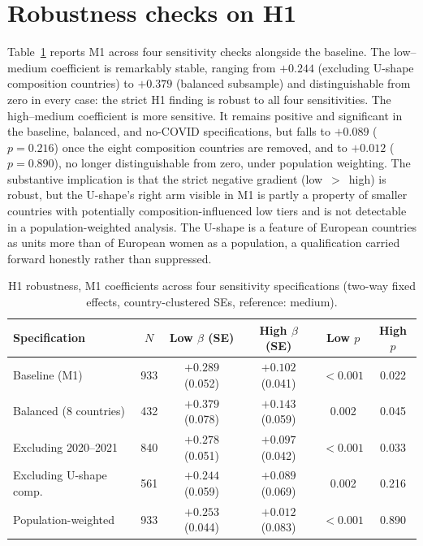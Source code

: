 \documentclass[12pt,a4paper]{report}
\begin{document}
\section{Robustness checks on H1}
Table~\ref{tab:robust} reports M1 across four sensitivity checks alongside the baseline. The low--medium
coefficient is remarkably stable, ranging from $+0.244$ (excluding U-shape composition countries) to
$+0.379$ (balanced subsample) and distinguishable from zero in every case: the strict H1 finding is
robust to all four sensitivities. The high--medium coefficient is more sensitive. It remains positive
and significant in the baseline, balanced, and no-COVID specifications, but falls to $+0.089$
($p=0.216$) once the eight composition countries are removed, and to $+0.012$ ($p=0.890$), no longer
distinguishable from zero, under population weighting. The substantive implication is that the strict
negative gradient (low~$>$~high) is robust, but the U-shape's right arm visible in M1 is partly a
property of smaller countries with potentially composition-influenced low tiers and is not detectable
in a population-weighted analysis.
The U-shape is a feature of European countries as units more than of European women as a population, a
qualification carried forward honestly rather than suppressed.

\begin{table}[ht]
\centering
\caption{H1 robustness, M1 coefficients across four sensitivity specifications (two-way fixed effects, country-clustered SEs, reference: medium).}
\label{tab:robust}
\small
\begin{tabular}{@{}lccccc@{}}
\toprule
Specification & $N$ & Low $\beta$ (SE) & High $\beta$ (SE) & Low $p$ & High $p$ \\
\midrule
Baseline (M1)            & 933 & $+0.289$ (0.052) & $+0.102$ (0.041) & $<0.001$ & 0.022 \\
Balanced (8 countries)   & 432 & $+0.379$ (0.078) & $+0.143$ (0.059) & 0.002 & 0.045 \\
Excluding 2020--2021     & 840 & $+0.278$ (0.051) & $+0.097$ (0.042) & $<0.001$ & 0.033 \\
Excluding U-shape comp.  & 561 & $+0.244$ (0.059) & $+0.089$ (0.069) & 0.002 & 0.216 \\
Population-weighted       & 933 & $+0.253$ (0.044) & $+0.012$ (0.083) & $<0.001$ & 0.890 \\
\bottomrule
\end{tabular}
\end{table}
\end{document}
